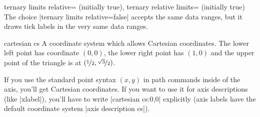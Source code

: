 \begin{pgfplotskeylist}{%
    ternary limits relative= (initially true),
    ternary relative limits= (initially true)%
}
    The choice |ternary limits relative=false| accepts the same data ranges,
    but it draws tick labels in the very same data ranges.
\begin{codeexample}[]
\end{codeexample}
\end{pgfplotskeylist}

\begin{coordinatesystem}{cartesian cs}
    A coordinate system which allows Cartesian coordinates. The lower left
    point has coordinate $(0,0)$, the lower right point has $(1,0)$ and the
    upper point of the triangle is at $(\nicefrac{1}{2},
    \nicefrac{\sqrt3}{2})$.

    If you use the standard point syntax $(x,y)$ in path commands inside of the
    axis, you'll get Cartesian coordinates. If you want to use it for axis
    descriptions (like |xlabel|), you'll have to write
    |cartesian cs:0,0| explicitly (axis labels have the default coordinate
    system |axis description cs|).
\begin{codeexample}[]
\end{codeexample}
\end{coordinatesystem}


